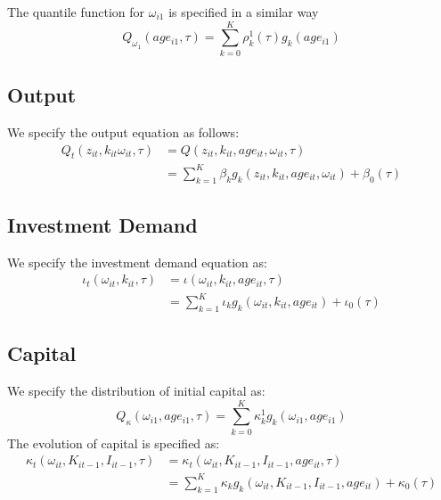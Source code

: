 \documentclass{article}
\begin{document}
\noindent The quantile function for $\omega_{i1}$ is specified in a similar way
\begin{equation}
\label{omega1model}
Q_{\omega_{1}}(age_{i1}, \tau)=\sum_{k=0}^{K}\rho_{k}^{1}(\tau)g_{k}(age_{i1})
\end{equation}

\subsection{Output}
We specify the output equation as follows:
\begin{equation}\label{ymodel}
\begin{split}
Q_{t}(z_{it}, k_{it} \omega_{it}, \tau)&=Q(z_{it}, k_{it}, age_{it}, \omega_{it}, \tau)\\
&=\sum_{k=1}^{K}\beta_{k}g_{k}(z_{it}, k_{it}, age_{it}, \omega_{it})+\beta_{0}(\tau)
\end{split}
\end{equation}

\subsection{Investment Demand}
We specify the investment demand equation as:
\begin{equation}\label{imodel}
\begin{split}
\iota_{t}(\omega_{it}, k_{it}, \tau)&=\iota(\omega_{it}, k_{it}, age_{it}, \tau)\\
&=\sum_{k=1}^{K}\iota_{k}g_{k}(\omega_{it}, k_{it}, age_{it})+\iota_{0}(\tau)
\end{split}
\end{equation}

\subsection{Capital}
We specify the distribution of initial capital as:
\begin{equation}\label{kinitial}
Q_{\kappa}(\omega_{i1}, age_{i1}, \tau)=\sum_{k=0}^{K}\kappa_{k}^{1}g_{k}(\omega_{i1}, age_{i1})
\end{equation}
The evolution of capital is specified as:
\begin{equation}\label{kevolution}
\begin{split}
\kappa_{t}(\omega_{it}, K_{it-1}, I_{it-1}, \tau)&=\kappa_{t}(\omega_{it}, K_{it-1}, I_{it-1}, age_{it}, \tau)\\
&=\sum_{k=1}^{K}\kappa_{k}g_{k}(\omega_{it}, K_{it-1}, I_{it-1}, age_{it})+\kappa_{0}(\tau)
\end{split}
\end{equation}
\end{document}
